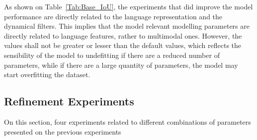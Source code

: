 As shown on Table~\ref{Tab:Base_IoU}, the experiments that did improve the model performance are directly related to the language representation and the dynamical filters. This implies that the model relevant modelling parameters are directly related to language features, rather to multimodal ones. However, the values shall not be greater or lesser than the default values, which reflects the sensibility of the model to undefitting if there are a reduced number of parameters, while if there are a large quantity of parameters, the model may start overfitting the dataset.

\subsection{Refinement Experiments}
\label{section:refinement}
On this section, four experiments related to different combinations of parameters presented on the previous experiments 

